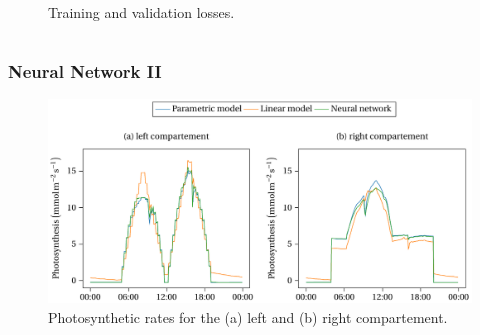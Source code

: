 \begin{frame}
\begin{columns}
\begin{column}{0.55\textwidth}
{\begin{figure}
                    \caption{Training and validation losses.}
                \end{figure}
            }
        \end{column}
        \begin{column}{0.55\textwidth}
            \begin{itemize}
            \end{itemize}
        \end{column}
    \end{columns}
\end{frame}

\begin{frame}
    \frametitle{Neural Network II}
    \begin{figure}
        \centering
        \includegraphics[scale=0.5]{figures/nn3.pdf}
        \caption{Photosynthetic rates for the (a) left and (b) right compartement.}
    \end{figure}
\end{frame}